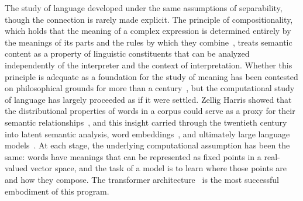 \documentclass[aps,prl,twocolumn,superscriptaddress,amsmath,amssymb]{revtex4-2}
\begin{document}
The study of language developed under the same assumptions of separability, though the connection is rarely made explicit. The principle of compositionality, which holds that the meaning of a complex expression is determined entirely by the meanings of its parts and the rules by which they combine~\cite{frege1892,montague1970}, treats semantic content as a property of linguistic constituents that can be analyzed independently of the interpreter and the context of interpretation. Whether this principle is adequate as a foundation for the study of meaning has been contested on philosophical grounds for more than a century~\cite{wittgenstein1953philosophical,quine1960word,gadamer1960truth}, but the computational study of language has largely proceeded as if it were settled. Zellig Harris showed that the distributional properties of words in a corpus could serve as a proxy for their semantic relationships~\cite{harris1954}, and this insight carried through the twentieth century into latent semantic analysis, word embeddings~\cite{mikolov2013,bengio2013representation}, and ultimately large language models~\cite{hochreiter1997long,devlin2019bert,brown2020language}. At each stage, the underlying computational assumption has been the same: words have meanings that can be represented as fixed points in a real-valued vector space, and the task of a model is to learn where those points are and how they compose. The transformer architecture~\cite{vaswani2017attention,bahdanau2015neural} is the most successful embodiment of this program.
\end{document}
